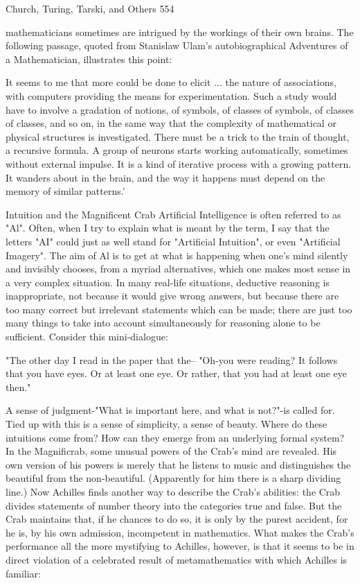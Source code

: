 {Church, Turing, Tarski, and Others                                                      554

mathematicians sometimes are intrigued by the workings of their own brains. The
following passage, quoted from Stanislaw Ulam's autobiographical Adventures of a
Mathematician, illustrates this point:

   It seems to me that more could be done to elicit ... the nature of associations, with
   computers providing the means for experimentation. Such a study would have to
   involve a gradation of notions, of symbols, of classes of symbols, of classes of
   classes, and so on, in the same way that the complexity of mathematical or
   physical structures is investigated.
        There must be a trick to the train of thought, a recursive formula. A group of
   neurons starts working automatically, sometimes without external impulse. It is a
   kind of iterative process with a growing pattern. It wanders about in the brain, and
   the way it happens must depend on the memory of similar patterns.'

                       Intuition and the Magnificent Crab
Artificial Intelligence is often referred to as "Al". Often, when I try to explain what is
meant by the term, I say that the letters "AI" could just as well stand for "Artificial
Intuition", or even "Artificial Imagery". The aim of Al is to get at what is happening
when one's mind silently and invisibly chooses, from a myriad alternatives, which one
makes most sense in a very complex situation. In many real-life situations, deductive
reasoning is inappropriate, not because it would give wrong answers, but because there
are too many correct but irrelevant statements which can be made; there are just too many
things to take into account simultaneously for reasoning alone to be sufficient. Consider
this mini-dialogue:

   "The other day I read in the paper that the--
   "Oh-you were reading? It follows that you have eyes. Or at least one eye. Or
   rather, that you had at least one eye then."

A sense of judgment-"What is important here, and what is not?"-is called for. Tied up
with this is a sense of simplicity, a sense of beauty. Where do these intuitions come from?
How can they emerge from an underlying formal system?
        In the Magnificrab, some unusual powers of the Crab's mind are revealed. His
own version of his powers is merely that he listens to music and distinguishes the
beautiful from the non-beautiful. (Apparently for him there is a sharp dividing line.) Now
Achilles finds another way to describe the Crab's abilities: the Crab divides statements of
number theory into the categories true and false. But the Crab maintains that, if he
chances to do so, it is only by the purest accident, for he is, by his own admission,
incompetent in mathematics. What makes the Crab's performance all the more mystifying
to Achilles, however, is that it seems to be in direct violation of a celebrated result of
metamathematics with which Achilles is familiar:

}
